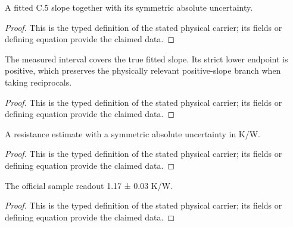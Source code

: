 \begin{definition}
  \label{def:physics:IPhO_2026_4_C_6:aux029}
  A fitted C.5 slope together with its symmetric absolute uncertainty.
\end{definition}
\begin{proof}
  This is the typed definition of the stated physical carrier; its fields or defining equation provide the claimed data.
\end{proof}

\begin{definition}
  \label{def:physics:IPhO_2026_4_C_6:aux030}
  The measured interval covers the true fitted slope. Its strict lower endpoint is positive, which preserves the physically relevant positive-slope branch when taking reciprocals.
\end{definition}
\begin{proof}
  This is the typed definition of the stated physical carrier; its fields or defining equation provide the claimed data.
\end{proof}

\begin{definition}
  \label{def:physics:IPhO_2026_4_C_6:aux031}
  A resistance estimate with a symmetric absolute uncertainty in K/W.
\end{definition}
\begin{proof}
  This is the typed definition of the stated physical carrier; its fields or defining equation provide the claimed data.
\end{proof}

\begin{definition}
  \label{def:physics:IPhO_2026_4_C_6:aux032}
  The official sample readout 1.17 ± 0.03 K/W.
\end{definition}
\begin{proof}
  This is the typed definition of the stated physical carrier; its fields or defining equation provide the claimed data.
\end{proof}

